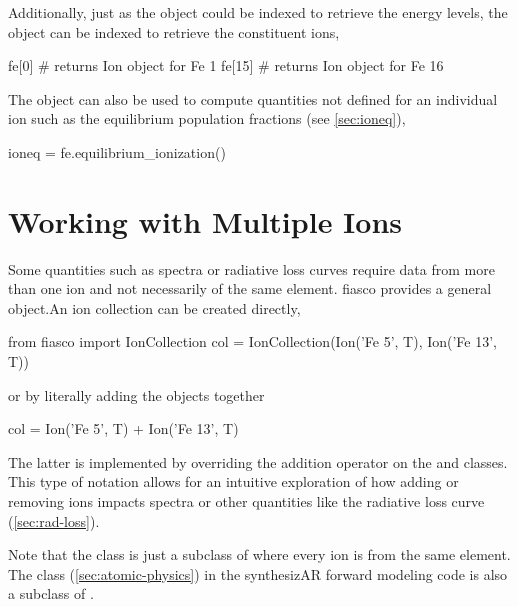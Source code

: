 Additionally, just as the  object could be indexed to retrieve the energy levels, the  object can be indexed to retrieve the constituent ions,
\begin{pyverbatim}[appendix1][baselinestretch=1,xleftmargin=3em]
fe[0] # returns Ion object for Fe 1
fe[15] # returns Ion object for Fe 16
\end{pyverbatim}

The  object can also be used to compute quantities not defined for an individual ion such as the equilibrium population fractions (see \autoref{sec:ioneq}),
\begin{pyverbatim}[appendix1][baselinestretch=1,xleftmargin=3em]
ioneq = fe.equilibrium_ionization()
\end{pyverbatim}

\section{Working with Multiple Ions}\label{sec:ion-collection}

Some quantities such as spectra or radiative loss curves require data from more than one ion and not necessarily of the same element. fiasco provides a general  object.An ion collection can be created directly,
\begin{pyverbatim}[appendix1][baselinestretch=1,xleftmargin=3em]
from fiasco import IonCollection
col = IonCollection(Ion('Fe 5', T), Ion('Fe 13', T))
\end{pyverbatim}
or by literally adding the objects together
\begin{pyverbatim}[appendix1][baselinestretch=1,xleftmargin=3em]
col = Ion('Fe 5', T) + Ion('Fe 13', T)
\end{pyverbatim}
The latter is implemented by overriding the addition operator on the  and  classes. This type of notation allows for an intuitive exploration of how adding or removing ions impacts spectra or other quantities like the radiative loss curve (\autoref{sec:rad-loss}).

Note that the  class is just a subclass of  where every ion is from the same element. The  class (\autoref{sec:atomic-physics}) in the synthesizAR forward modeling code is also a subclass of .